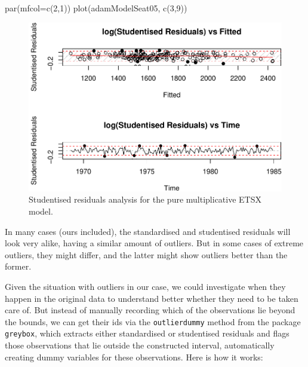 \documentclass[
]{book}
\newenvironment{Shaded}{\begin{snugshade}}{\end{snugshade}}
\newcommand{\AttributeTok}[1]{\textcolor[rgb]{0.77,0.63,0.00}{#1}}
\newcommand{\DecValTok}[1]{\textcolor[rgb]{0.00,0.00,0.81}{#1}}
\newcommand{\FunctionTok}[1]{\textcolor[rgb]{0.00,0.00,0.00}{#1}}
\newcommand{\NormalTok}[1]{#1}
\theoremstyle{definition}
\theoremstyle{definition}
\theoremstyle{definition}
\theoremstyle{definition}
\theoremstyle{remark}
\begin{document}
\begin{Shaded}
\begin{Highlighting}[]
\FunctionTok{par}\NormalTok{(}\AttributeTok{mfcol=}\FunctionTok{c}\NormalTok{(}\DecValTok{2}\NormalTok{,}\DecValTok{1}\NormalTok{))}
\FunctionTok{plot}\NormalTok{(adamModelSeat05, }\FunctionTok{c}\NormalTok{(}\DecValTok{3}\NormalTok{,}\DecValTok{9}\NormalTok{))}
\end{Highlighting}
\end{Shaded}

\begin{figure}
\centering
\includegraphics{Svetunkov--2022----ADAM_files/figure-latex/adamModelSeat05Student-1.pdf}
\caption{\label{fig:adamModelSeat05Student}Studentised residuals analysis for the pure multiplicative ETSX model.}
\end{figure}

In many cases (ours included), the standardised and studentised residuals will look very alike, having a similar amount of outliers. But in some cases of extreme outliers, they might differ, and the latter might show outliers better than the former.

Given the situation with outliers in our case, we could investigate when they happen in the original data to understand better whether they need to be taken care of. But instead of manually recording which of the observations lie beyond the bounds, we can get their ids via the \texttt{outlierdummy} method from the package \texttt{greybox}, which extracts either standardised or studentised residuals and flags those observations that lie outside the constructed interval, automatically creating dummy variables for these observations. Here is how it works:
\end{document}
